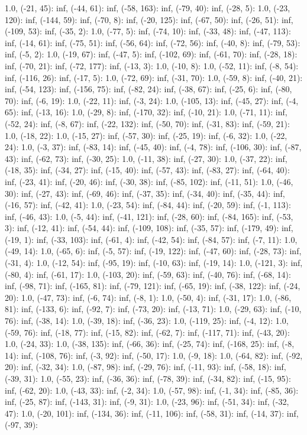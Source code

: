 \documentclass[parskip=half]{scrartcl}
\begin{document}
1.0, (-21, 45): inf, (-44, 61): inf, (-58, 163): inf, (-79, 40): inf, (-28, 5): 1.0, (-23, 120): inf, (-144, 59): inf, (-70, 8): inf, (-20, 125): inf, (-67, 50): inf, (-26, 51): inf, (-109, 53): inf, (-35, 2): 1.0, (-77, 5): inf, (-74, 10): inf, (-33, 48): inf, (-47, 113): inf, (-14, 61): inf, (-75, 51): inf, (-56, 64): inf, (-72, 56): inf, (-40, 8): inf, (-79, 53): inf, (-5, 2): 1.0, (-19, 67): inf, (-47, 5): inf, (-102, 69): inf, (-61, 70): inf, (-28, 18): inf, (-70, 21): inf, (-72, 177): inf, (-13, 3): 1.0, (-10, 8): 1.0, (-52, 11): inf, (-8, 54): inf, (-116, 26): inf, (-17, 5): 1.0, (-72, 69): inf, (-31, 70): 1.0, (-59, 8): inf, (-40, 21): inf, (-54, 123): inf, (-156, 75): inf, (-82, 24): inf, (-38, 67): inf, (-25, 6): inf, (-80, 70): inf, (-6, 19): 1.0, (-22, 11): inf, (-3, 24): 1.0, (-105, 13): inf, (-45, 27): inf, (-4, 65): inf, (-13, 16): 1.0, (-29, 8): inf, (-170, 32): inf, (-10, 21): 1.0, (-71, 11): inf, (-52, 24): inf, (-8, 67): inf, (-22, 132): inf, (-50, 70): inf, (-31, 83): inf, (-59, 21): 1.0, (-18, 22): 1.0, (-15, 27): inf, (-57, 30): inf, (-25, 19): inf, (-6, 32): 1.0, (-22, 24): 1.0, (-3, 37): inf, (-83, 14): inf, (-45, 40): inf, (-4, 78): inf, (-106, 30): inf, (-87, 43): inf, (-62, 73): inf, (-30, 25): 1.0, (-11, 38): inf, (-27, 30): 1.0, (-37, 22): inf, (-18, 35): inf, (-34, 27): inf, (-15, 40): inf, (-57, 43): inf, (-83, 27): inf, (-64, 40): inf, (-23, 41): inf, (-20, 46): inf, (-30, 38): inf, (-85, 102): inf, (-11, 51): 1.0, (-46, 30): inf, (-27, 43): inf, (-69, 46): inf, (-37, 35): inf, (-34, 40): inf, (-35, 44): inf, (-16, 57): inf, (-42, 41): 1.0, (-23, 54): inf, (-84, 44): inf, (-20, 59): inf, (-1, 113): inf, (-46, 43): 1.0, (-5, 44): inf, (-41, 121): inf, (-28, 60): inf, (-84, 165): inf, (-53, 3): inf, (-12, 41): inf, (-54, 44): inf, (-109, 108): inf, (-35, 57): inf, (-179, 49): inf, (-19, 1): inf, (-33, 103): inf, (-61, 4): inf, (-42, 54): inf, (-84, 57): inf, (-7, 11): 1.0, (-49, 14): 1.0, (-65, 6): inf, (-5, 57): inf, (-19, 122): inf, (-47, 60): inf, (-28, 73): inf, (-31, 4): 1.0, (-12, 54): inf, (-95, 19): inf, (-10, 63): inf, (-19, 14): 1.0, (-121, 3): inf, (-80, 4): inf, (-61, 17): 1.0, (-103, 20): inf, (-59, 63): inf, (-40, 76): inf, (-68, 14): inf, (-98, 71): inf, (-165, 81): inf, (-79, 121): inf, (-65, 19): inf, (-38, 122): inf, (-24, 20): 1.0, (-47, 73): inf, (-6, 74): inf, (-8, 1): 1.0, (-50, 4): inf, (-31, 17): 1.0, (-86, 81): inf, (-133, 6): inf, (-92, 7): inf, (-73, 20): inf, (-13, 71): 1.0, (-29, 63): inf, (-10, 76): inf, (-38, 14): 1.0, (-39, 18): inf, (-36, 23): 1.0, (-119, 25): inf, (-4, 12): 1.0, (-59, 76): inf, (-18, 77): inf, (-15, 82): inf, (-62, 7): inf, (-117, 71): inf, (-43, 20): 1.0, (-24, 33): 1.0, (-38, 135): inf, (-66, 36): inf, (-25, 74): inf, (-168, 25): inf, (-8, 14): inf, (-108, 76): inf, (-3, 92): inf, (-50, 17): 1.0, (-9, 18): 1.0, (-64, 82): inf, (-92, 20): inf, (-32, 34): 1.0, (-87, 98): inf, (-29, 76): inf, (-11, 93): inf, (-58, 18): inf, (-39, 31): 1.0, (-55, 23): inf, (-36, 36): inf, (-78, 39): inf, (-34, 82): inf, (-15, 95): inf, (-62, 20): 1.0, (-43, 33): inf, (-2, 34): 1.0, (-57, 98): inf, (-1, 34): inf, (-85, 36): inf, (-25, 87): inf, (-143, 31): inf, (-9, 31): 1.0, (-23, 96): inf, (-51, 34): inf, (-32, 47): 1.0, (-20, 101): inf, (-134, 36): inf, (-11, 106): inf, (-58, 31): inf, (-14, 37): inf, (-97, 39): 
\end{document}
